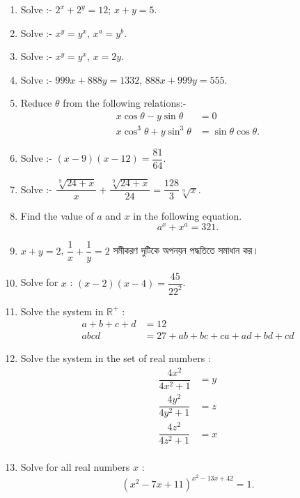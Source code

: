 \documentclass[11pt, a4paper]{article}
\begin{document}
\begin{enumerate}

	\item Solve :- $ 2^x + 2^y = 12  $; $ x+y = 5 $.
	\item Solve :- $ x^y = y^x $, $ x^a = y^b $.
	
	\item Solve :- $ x^y = y^x $, $ x = 2y $.
	
	\item Solve :- $ 999x + 888y = 1332 $, $ 888x + 999y = 555 $.

	\item Reduce $\theta$ from the following relations:-
	\begin{align*}
	x\cos \theta - y \sin \theta &= 0 \\
	x\cos^3 \theta + y \sin^3 \theta &= \sin \theta \cos \theta.
	\end{align*}
	
	\item Solve :- $\left( x - 9 \right) \left( x - 12 \right) = \dfrac{81}{64}$.
	
	\item Solve :- $\dfrac{\sqrt[9]{24+x}}{x} + \dfrac{\sqrt[9]{24+x}}{24} = \dfrac{128}{3} \sqrt[9]{x}$.
	
	\item Find the value of $a$ and $x$ in the following equation. $$a^x + x^a = 321.$$
	
	\item $x + y = 2$, $ \dfrac{1}{x} + \dfrac{1}{y} = 2$ \textbengali{সমীকরণ দুটিকে অপনয়ন পদ্ধতিতে সমাধান কর।}
	
	\item Solve for $x$ : $(x-2)(x-4) = \dfrac{45}{22^2}$.
	
	\item Solve the system in $\mathbb{R^+}$ :
	\begin{align*}
	a + b + c + d &= 12 \\
	abcd &= 27 + ab + bc + ca + ad + bd + cd
	\end{align*}

	\item Solve the system in the set of real numbers :
	\begin{align*}
	\dfrac{4x^2}{4x^2 + 1} &= y \\
	\dfrac{4y^2}{4y^2 + 1} &= z \\
	\dfrac{4z^2}{4z^2 + 1} &= x \\
	\end{align*}
	
	\item Solve for all real numbers $x$ :
	$$(x^2 - 7x + 11)^{x^2 - 13x + 42} = 1.$$
\end{enumerate}
\end{document}
